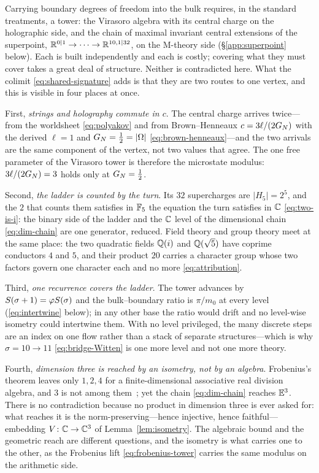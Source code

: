 \begin{proposition}\label{prop:two-towers}
Carrying boundary degrees of freedom into the bulk requires, in the standard treatments, a tower:
the Virasoro algebra with its central charge on the holographic side, and the chain of maximal
invariant central extensions of the superpoint, $\mathbb{R}^{0|1}\to\cdots\to\mathbb{R}^{10,1|32}$, on the M-theory
side (\S\ref{app:superpoint} below). Each is built independently and each is costly; covering what they
must cover takes a great deal of structure. Neither is contradicted here. What the colimit
\eqref{eq:shared-signature} adds is that they are two routes to one vertex, and this is visible in
four places at once.

First, \emph{strings and holography commute in $c$}. The central charge arrives twice---from the
worldsheet \eqref{eq:polyakov} and from Brown--Henneaux $c=3\ell/(2G_{N})$ with the derived $\ell=1$
and $G_{N}=\tfrac12=|\Omega|$ \eqref{eq:brown-henneaux}---and the two arrivals are the same component of
the vertex, not two values that agree. The one free parameter of the Virasoro tower is therefore the
microstate modulus: $3\ell/(2G_{N})=3$ holds only at $G_{N}=\tfrac12$.

Second, \emph{the ladder is counted by the turn}. Its $32$ supercharges are $|H_5|=2^{5}$, and the
$2$ that counts them satisfies in $\mathbb{F}_5$ the equation the turn satisfies in $\mathbb{C}$
\eqref{eq:two-is-i}: the binary side of the ladder and the $\mathbb{C}$ level of the dimensional chain
\eqref{eq:dim-chain} are one generator, reduced. Field theory and group theory meet at the same
place: the two quadratic fields $\mathbb{Q}(i)$ and $\mathbb{Q}(\sqrt5)$ have coprime conductors $4$ and $5$, and
their product $20$ carries a character group whose two factors govern one character each and no more
\eqref{eq:attribution}.

Third, \emph{one recurrence covers the ladder}. The tower advances by $S(\sigma+1)=\varphi S(\sigma)$
and the bulk--boundary ratio is $\pi/m_0$ at every level (\eqref{eq:intertwine} below); in any other base the
ratio would drift and no level-wise isometry could intertwine them. With no level privileged, the
many discrete steps are an index on one flow rather than a stack of separate structures---which is
why $\sigma=10\to11$ \eqref{eq:bridge-Witten} is one more level and not one more theory.

Fourth, \emph{dimension three is reached by an isometry, not by an algebra}. Frobenius's theorem
leaves only $1,2,4$ for a finite-dimensional associative real division algebra, and $3$ is not among
them~\cite{Frobenius1878}; yet the chain \eqref{eq:dim-chain} reaches $\mathbb{E}^{3}$. There is no
contradiction because no product in dimension three is ever asked for: what reaches it is the
norm-preserving---hence injective, hence faithful---embedding $V\colon\mathbb{C}\to\mathbb{C}^{3}$ of
Lemma~\ref{lem:isometry}. The algebraic bound and the geometric reach are different questions, and
the isometry is what carries one to the other, as the Frobenius lift \eqref{eq:frobenius-tower}
carries the same modulus on the arithmetic side.


\end{proposition}
